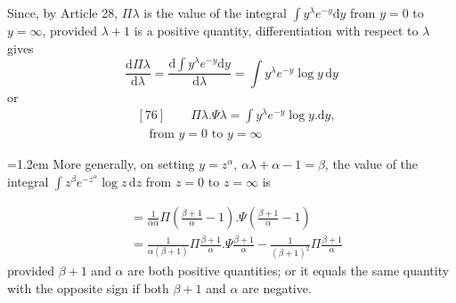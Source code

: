 Since, by Article 28, $\Pi\lambda$ is the value of the integral $\int y^\lambda e^{-y}\mathrm{d}y$ from $y=0$ to $y=\infty$, provided $\lambda+1$ is a positive quantity, differentiation with respect to $\lambda$ gives
\[
\frac{\mathrm{d}\Pi\lambda}{\mathrm{d}\lambda}
=\frac{\mathrm{d}\int y^\lambda e^{-y}\mathrm{d}y}{\mathrm{d}\lambda}
=\int y^\lambda e^{-y}\log y\,\mathrm{d}y
\]
or
\[
\begin{aligned}
&[76]\qquad \Pi\lambda.\Psi\lambda=\int y^\lambda e^{-y}\log y.\mathrm{d}y,\\[4pt]
&\quad\text{from }y=0\text{ to }y=\infty
\end{aligned}
\]
\par{}
{\raggedright\parindent=1.2em More generally, on setting $y=z^\alpha$, $\alpha\lambda+\alpha-1=\beta$, the value of the integral $\int z^\beta e^{-z^\alpha}\log z\,\mathrm{d}z$ from $z=0$ to $z=\infty$ is\par}
\[
\begin{aligned}
&=\frac{1}{\alpha\alpha}\Pi\left(\frac{\beta+1}{\alpha}-1\right).\Psi\left(\frac{\beta+1}{\alpha}-1\right)
\\[4pt]
&=\frac{1}{\alpha(\beta+1)}\Pi\frac{\beta+1}{\alpha}.\Psi\frac{\beta+1}{\alpha}
-\frac{1}{(\beta+1)^2}\Pi\frac{\beta+1}{\alpha}
\end{aligned}
\]
provided $\beta+1$ and $\alpha$ are both positive quantities; or it equals the same quantity with the opposite sign if both $\beta+1$ and $\alpha$ are negative.

